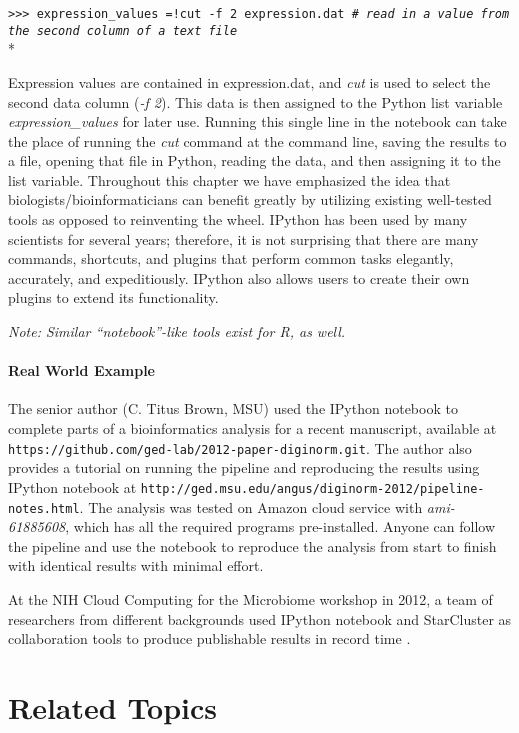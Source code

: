 \documentclass[ChapterTOCs,krantz2]{krantz} %
\begin{document}
\texttt{>>> expression\_values =!cut -f 2 expression.dat \emph{\# read in a
value from the second column of a text file}}\\*

Expression values are contained in expression.dat, and 
\emph{cut} is used to select the second data
column (\emph{-f 2}).  This data is then assigned to the Python list variable
\emph{expression\_values} for later use.  Running this single line in
the notebook can take the place of running the \emph{cut} command at the command line,
saving the results to a file, opening that file in Python, reading the data,
and then assigning it to the list variable.  Throughout this chapter we have
emphasized the idea that biologists/bioinformaticians can benefit greatly by
utilizing existing well-tested tools as opposed to reinventing the wheel.
IPython has been used by many scientists for several years; therefore, it is
not surprising that there are many commands, shortcuts, and plugins that
perform common tasks elegantly, accurately, and expeditiously.  
IPython also allows users to
create their own plugins to extend its functionality.

\textsl{Note: Similar ``notebook''-like tools exist for R, as well.}

\paragraph{Real World Example}

The senior author (C. Titus Brown, MSU) used the IPython notebook 
to complete parts of a bioinformatics analysis for a recent manuscript, available at
\texttt{https://github.com/ged-lab/2012-paper-diginorm.git}. The author also
provides a tutorial on running the pipeline and reproducing the
results using IPython notebook at
\texttt{http://ged.msu.edu/angus/diginorm-2012/pipeline-notes.html}. 
The analysis was tested on Amazon cloud service with
\emph{ami-61885608}, which has all the required programs pre-installed. Anyone
can follow the pipeline and use the notebook to reproduce the
analysis from start to finish with identical results with minimal effort.

At the NIH Cloud Computing for the Microbiome workshop in 2012, a 
team of researchers from different backgrounds used IPython notebook 
and StarCluster as collaboration tools 
to produce publishable results in record time \cite{RaganKelley2012}.

\section{Related Topics}
\end{document}
